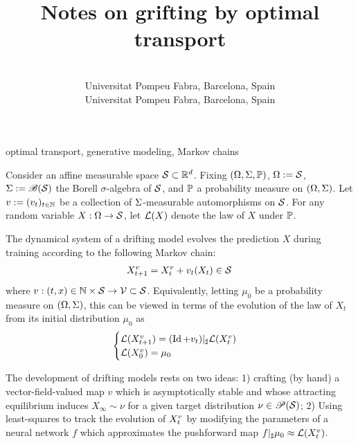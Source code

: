 \documentclass[twoside,10pt]{../jmlr}
\title{Notes on grifting by optimal transport}
\author{
 \Name[{Gergely~Neu}]{Gergely Neu} \Email{gergely.neu@gmail.com}\\
 \addr Universitat Pompeu Fabra, Barcelona, Spain
 \AND
 \Name[{Lorenzo~Croissant}]{Lorenzo Croissant} \Email{lorenzo.croissant@upf.edu}\\
 \addr Universitat Pompeu Fabra, Barcelona, Spain
 }
\begin{document}
\maketitle

 

\begin{keywords}%
  optimal transport, generative modeling, Markov chains
\end{keywords}


Consider an affine measurable space $\mathcal{S}\subset\mathbb{R}^d$. Fixing $(\Omega,\Sigma,\mathbb{P})$, $\Omega:=\mathcal{S}$, $\Sigma:=\mathscr{B}(\mathcal{S})$ the Borell $\sigma$-algebra of $\mathcal{S}$, and $\mathbb{P}$ a probability measure on $(\Omega,\Sigma)$. Let $v:=(v_t)_{t\in\mathbb{N}}$ be a collection of $\Sigma$-measurable automorphisms on $\mathcal{S}$. For any random variable $X:\Omega\to\mathcal{S}$, let $\mathcal{L}(X)$ denote the law of $X$ under $\mathbb{P}$.

The dynamical system of a drifting model \citep{deng2026generative} evolves the prediction $X$ during training according to the following Markov chain:
\begin{align}
    X_{t+1}^v=X_t^v+ v_t(X_t)\in\mathcal{S} \label{eq: dynamical system}\,
\end{align}
where $v:(t,x)\in\mathbb{N}\times\mathcal{S}\to\mathcal{V}\subset\mathcal{S}$. 
Equivalently, letting $\mu_0$ be a probability measure on $(\Omega,\Sigma)$, this can be viewed in terms of the evolution of the law of $X_t$ from its initial distribution $\mu_0$ as
\begin{align}
    \begin{cases} \mathcal{L}(X_{t+1}^v)=(\operatorname{Id}+v_t)\vert_\sharp\mathcal{L}(X_t^v)\\ \mathcal{L}(X_0^v)=\mu_0 \end{cases}
\end{align}

The development of drifting models \cite{deng2026generative} rests on two ideas: 1) crafting (by hand) a vector-field-valued map $v$ which is asymptotically stable and whose attracting equilibrium induces $X_{\infty}\sim\nu$ for a given target distribution $\nu\in\mathscr{P}(\mathcal{S})$; 2) Using least-squares to track the evolution of $X_{t}^v$ by modifying the parameters of a neural network $f$ which approximates the pushforward map $f\vert_\sharp\mu_0\approx \mathcal{L}(X_{t}^v)$.
\end{document}
